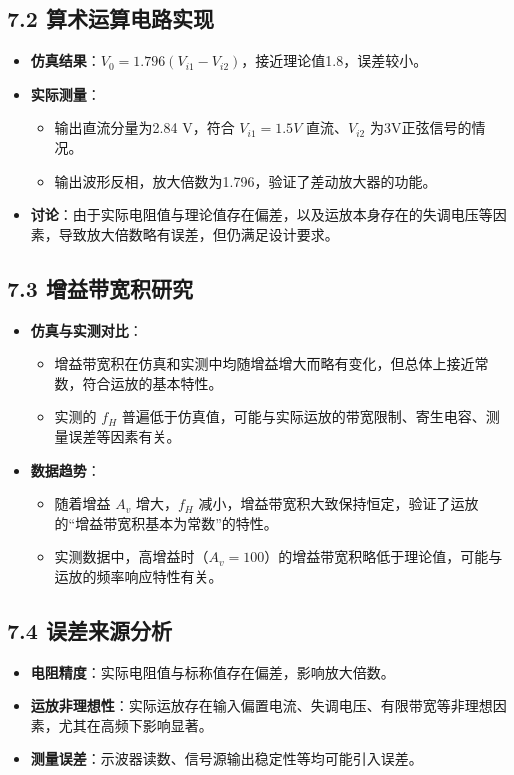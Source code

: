 \documentclass[12pt,a4paper]{article}
\begin{document}
\subsection*{7.2 算术运算电路实现}
\begin{itemize}
    \item \textbf{仿真结果}：\( V_0 = 1.796(V_{i1} - V_{i2}) \)，接近理论值1.8，误差较小。
    \item \textbf{实际测量}：
    \begin{itemize}
        \item 输出直流分量为2.84 V，符合 \( V_{i1} = 1.5V \) 直流、\( V_{i2} \) 为3V正弦信号的情况。
        \item 输出波形反相，放大倍数为1.796，验证了差动放大器的功能。
    \end{itemize}
    \item \textbf{讨论}：由于实际电阻值与理论值存在偏差，以及运放本身存在的失调电压等因素，导致放大倍数略有误差，但仍满足设计要求。
\end{itemize}

\subsection*{7.3 增益带宽积研究}
\begin{itemize}
    \item \textbf{仿真与实测对比}：
    \begin{itemize}
        \item 增益带宽积在仿真和实测中均随增益增大而略有变化，但总体上接近常数，符合运放的基本特性。
        \item 实测的 \( f_H \) 普遍低于仿真值，可能与实际运放的带宽限制、寄生电容、测量误差等因素有关。
    \end{itemize}
    \item \textbf{数据趋势}：
    \begin{itemize}
        \item 随着增益 \( A_v \) 增大，\( f_H \) 减小，增益带宽积大致保持恒定，验证了运放的“增益带宽积基本为常数”的特性。
        \item 实测数据中，高增益时（\( A_v = 100 \)）的增益带宽积略低于理论值，可能与运放的频率响应特性有关。
    \end{itemize}
\end{itemize}

\subsection*{7.4 误差来源分析}
\begin{itemize}
    \item \textbf{电阻精度}：实际电阻值与标称值存在偏差，影响放大倍数。
    \item \textbf{运放非理想性}：实际运放存在输入偏置电流、失调电压、有限带宽等非理想因素，尤其在高频下影响显著。
    \item \textbf{测量误差}：示波器读数、信号源输出稳定性等均可能引入误差。
\end{itemize}
\end{document}
